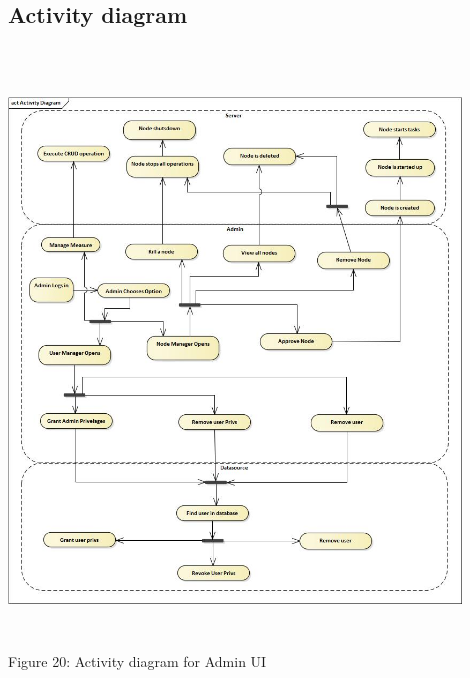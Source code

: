 \subsection{Activity diagram}\\
    \includegraphics[width=12cm,height=15cm,keepaspectratio]{admin_ui/images/Activity_Diagram.jpg}
	\begin{center}
	    \small{Figure 20: Activity diagram for Admin UI}
    \end{center}


